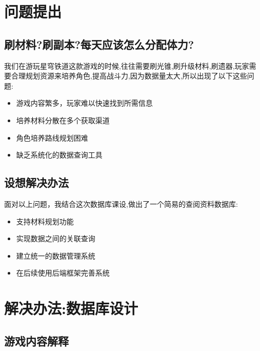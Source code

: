 \documentclass{beamer}
\begin{document}
\section{问题提出}

\subsection{刷材料?刷副本?每天应该怎么分配体力?}

\begin{frame}
    
    我们在游玩星穹铁道这款游戏的时候,往往需要刷光锥,刷升级材料,刷遗器,玩家需要合理规划资源来培养角色,提高战斗力,因为数据量太大,所以出现了以下这些问题:
    \begin{itemize}
        \item 游戏内容繁多，玩家难以快速找到所需信息
        \item 培养材料分散在多个获取渠道
        \item 角色培养路线规划困难
        \item 缺乏系统化的数据查询工具
    \end{itemize}
\end{frame}

\subsection{设想解决办法}
\begin{frame}
    面对以上问题，我结合这次数据库课设,做出了一个简易的查阅资料数据库:
    \begin{itemize}
        \item 支持材料规划功能
        \item 实现数据之间的关联查询
        \item 建立统一的数据管理系统
        \item 在后续使用后端框架完善系统
    \end{itemize}
\end{frame}



\section{解决办法:数据库设计}

\subsection{游戏内容解释}
\end{document}
